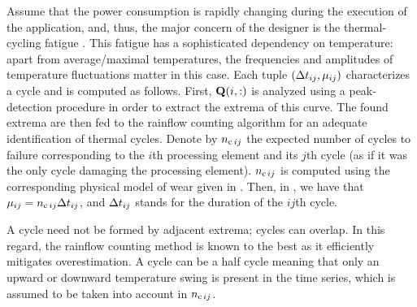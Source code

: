 Assume that the power consumption is rapidly changing during the execution of the application, and, thus, the major concern of the designer is the thermal-cycling fatigue \cite{jedec2011}.
This fatigue has a sophisticated dependency on temperature: apart from average/maximal temperatures, the frequencies and amplitudes of temperature fluctuations matter in this case.
Each tuple $(\dt_{ij}, \mu_{ij})$ characterizes a cycle and is computed as follows.
First, $\mQ(i, :)$ is analyzed using a peak-detection procedure in order to extract the extrema of this curve.
The found extrema are then fed to the rainflow counting algorithm \cite{xiang2010} for an adequate identification of thermal cycles.
Denote by $\ncycles[ij]$ the expected number of cycles to failure corresponding to the $i$th processing element and its $j$th cycle (as if it was the only cycle damaging the processing element).
$\ncycles[ij]$ is computed using the corresponding physical model of wear given in \cite{jedec2011, xiang2010}.
Then, in , we have that $\mu_{ij} = \ncycles[ij] \dt_{ij}$, and $\dt_{ij}$ stands for the duration of the $ij$th cycle.
\begin{remark} 
A cycle need not be formed by adjacent extrema; cycles can overlap.
In this regard, the rainflow counting method is known to the best as it efficiently mitigates overestimation.
A cycle can be a half cycle meaning that only an upward or downward temperature swing is present in the time series, which is assumed to be taken into account in $\ncycles[ij]$.
\end{remark}
